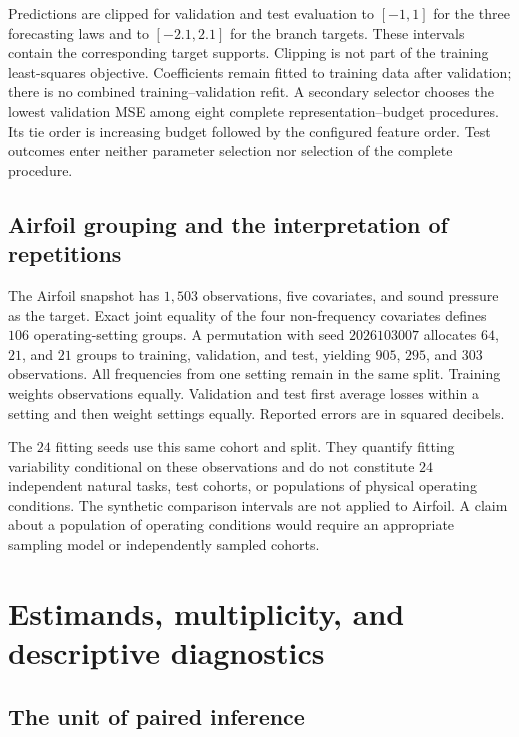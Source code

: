 Predictions are clipped for validation and test evaluation to $[-1,1]$
for the three forecasting laws and to $[-2.1,2.1]$ for the branch targets.
These intervals contain the corresponding target supports. Clipping is
not part of the training least-squares objective. Coefficients remain
fitted to training data after validation; there is no combined
training--validation refit. A secondary selector chooses the lowest
validation MSE among eight complete representation--budget procedures.
Its tie order is increasing budget followed by the configured feature
order. Test outcomes enter neither parameter selection nor selection
of the complete procedure.

\subsection{Airfoil grouping and the interpretation of repetitions}

The Airfoil snapshot has $1{,}503$ observations, five covariates, and
sound pressure as the target. Exact joint equality of the four
non-frequency covariates defines $106$ operating-setting groups.
A permutation with seed $2026103007$ allocates $64$, $21$, and $21$
groups to training, validation, and test, yielding $905$, $295$, and
$303$ observations. All frequencies from one setting remain in the
same split. Training weights observations equally. Validation and
test first average losses within a setting and then weight settings
equally. Reported errors are in squared decibels.

The $24$ fitting seeds use this same cohort and split. They quantify
fitting variability conditional on these observations and do not
constitute $24$ independent natural tasks, test cohorts, or populations
of physical operating conditions. The synthetic comparison intervals
are not applied to Airfoil. A claim about a population of operating
conditions would require an appropriate sampling model or independently
sampled cohorts.

\section{Estimands, multiplicity, and descriptive diagnostics}\label{c:app:statistics}

\subsection{The unit of paired inference}

